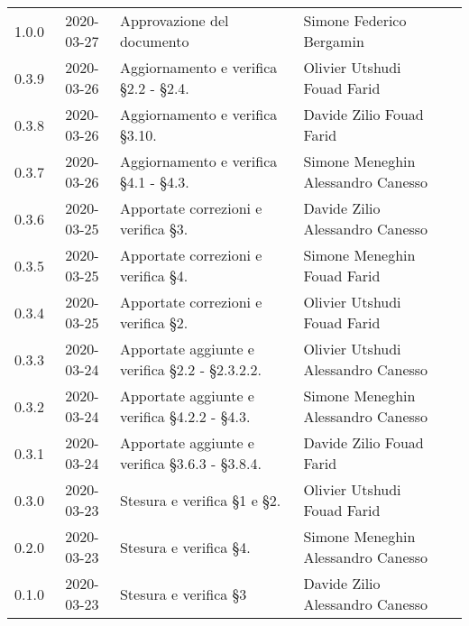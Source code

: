 {\begin{longtable}{ c c  C{4cm}  C{3.8cm}  C{3cm} }
    1.0.0 & 2020-03-27 & Approvazione del documento & Simone Federico Bergamin &\Res{} \\
    	0.3.9 & 2020-03-26 & Aggiornamento e verifica \S 2.2 - \S 2.4. & Olivier Utshudi \newline Fouad Farid &\adm{} \newline  \ver{}\\
		0.3.8 & 2020-03-26 & Aggiornamento e verifica \S 3.10. & Davide Zilio \newline Fouad Farid &\adm{} \newline  \ver{}\\
		0.3.7 & 2020-03-26 & Aggiornamento e verifica \S 4.1 - \S 4.3. & Simone Meneghin \newline Alessandro Canesso &\adm{} \newline  \ver{}\\
		0.3.6 & 2020-03-25 & Apportate correzioni e verifica \S 3. & Davide Zilio \newline Alessandro Canesso &\adm{} \newline  \ver{}\\
    	0.3.5 & 2020-03-25 & Apportate correzioni e verifica \S 4.  & Simone Meneghin \newline Fouad Farid &\adm{} \newline  \ver{}\\	
   		0.3.4 & 2020-03-25 & Apportate correzioni e verifica \S 2. & Olivier Utshudi \newline Fouad Farid &\adm{} \newline  \ver{}\\
		0.3.3 & 2020-03-24 & Apportate aggiunte e verifica \S 2.2 - \S 2.3.2.2. & Olivier Utshudi \newline Alessandro Canesso &\adm{} \newline  \ver{}\\
		0.3.2 & 2020-03-24 & Apportate aggiunte e verifica \S 4.2.2 - \S 4.3. & Simone Meneghin \newline Alessandro Canesso &\adm{} \newline  \ver{}\\		
		0.3.1 & 2020-03-24 & Apportate aggiunte e verifica \S 3.6.3 - \S 3.8.4.& Davide Zilio \newline Fouad Farid &\adm{} \newline  \ver{}\\
		0.3.0 & 2020-03-23 & Stesura e verifica \S 1 e \S 2. & Olivier Utshudi \newline Fouad Farid &\adm{} \newline  \ver{}\\
		0.2.0 & 2020-03-23 & Stesura e verifica \S 4. & Simone Meneghin \newline Alessandro Canesso &\adm{} \newline  \ver{}\\
		0.1.0 & 2020-03-23 & Stesura e verifica \S 3 & Davide Zilio \newline Alessandro Canesso &\adm{} \newline  \ver{}\\		
	\end{longtable}
}
